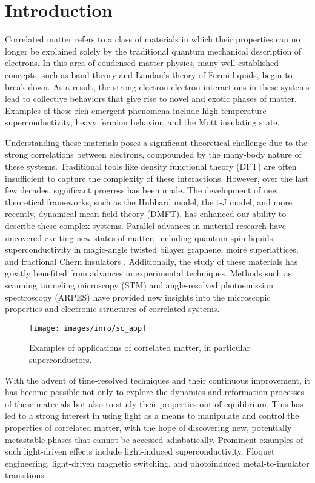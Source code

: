 \cleardoublepage
\chapter*{Introduction}


Correlated matter refers to a class of materials in which their properties can no longer be explained solely by the traditional quantum mechanical description of electrons.
In this area of condensed matter physics, many well-established concepts, such as band theory \cite{bethe_theorie_1928,sommerfeld_zur_1928,bloch_bemerkung_1929} and Landau’s theory of Fermi liquids, begin to break down.
As a result, the strong electron-electron interactions in these systems lead to collective behaviors that give rise to novel and exotic phases of matter.
Examples of these rich emergent phenomena include high-temperature superconductivity, heavy fermion behavior, and the Mott insulating state.

Understanding these materials poses a significant theoretical challenge due to the strong correlations between electrons, compounded by the many-body nature of these systems.
Traditional tools like density functional theory (DFT) are often insufficient to capture the complexity of these interactions.
However, over the last few decades, significant progress has been made.
The development of new theoretical frameworks, such as the Hubbard model, the t-J model, and more recently, dynamical mean-field theory (DMFT), has enhanced our ability to describe these complex systems.
Parallel advances in material research have uncovered exciting new states of matter, including quantum spin liquids, superconductivity in magic-angle twisted bilayer graphene, moiré superlattices, and fractional Chern insulators \cite{zeng_thermodynamic_2023,oh_evidence_2021,andrei_marvels_2021}.
Additionally, the study of these materials has greatly benefited from advances in experimental techniques.
Methods such as scanning tunneling microscopy (STM) and angle-resolved photoemission spectroscopy (ARPES) have provided new insights into the microscopic properties and electronic structures of correlated systems.
\begin{figure}
	\centering
	\texttt{[image: images/inro/sc\_app]}
	\caption{Examples of applications of correlated matter, in particular superconductors.}
	\label{fig:scapp}
\end{figure}

With the advent of time-resolved techniques and their continuous improvement, it has become possible not only to explore the dynamics and reformation processes of these materials but also to study their properties out of equilibrium.
This has led to a strong interest in using light as a means to manipulate and control the properties of correlated matter, with the hope of discovering new, potentially metastable phases that cannot be accessed adiabatically.
Prominent examples of such light-driven effects include light-induced superconductivity, Floquet engineering, light-driven magnetic switching, and photoinduced metal-to-insulator transitions \cite{fausti_light-induced_2011,takubo_photoinduced_2008}.


